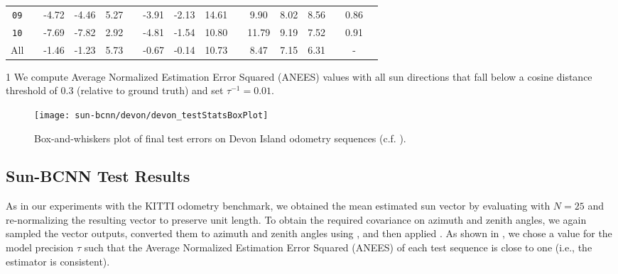 \begin{table}[]
{\begin{threeparttable}
\begin{tabular}{@{}cccccccccccccccc@{}}
\texttt{09} &  & -4.72 & -4.46           & 5.27  &  & -3.91 & -2.13          & 14.61 &  & 9.90  & 8.02            & 8.56 &  & 0.86                 \\
\texttt{10} &  & -7.69 & -7.82           & 2.92  &  & -4.81 & -1.54          & 10.80 &  & 11.79 & 9.19            & 7.52 &  & 0.91                 \\ \midrule
  All  &  & -1.46 & -1.23           & 5.73 &  & -0.67 & -0.14         & 10.73 &  & 8.47  & 7.15            & 6.31 &  &  - \\ \bottomrule                   
\end{tabular}
\begin{tablenotes}
	\item[1] We compute Average Normalized Estimation Error Squared (ANEES) values with all sun directions that fall below a cosine distance threshold of $0.3$ (relative to ground truth) and set $\tau^{-1} = 0.01$.
 \end{tablenotes}
\end{threeparttable}
}
\end{table}

\begin{figure}
    \centering
    \texttt{[image: sun-bcnn/devon/devon\_testStatsBoxPlot]}
    \caption{Box-and-whiskers plot of final test errors on Devon Island odometry sequences (c.f. ).}
    \label{fig:sun-bcnn_devon_test_error_whiskers}
\end{figure}

\subsection{Sun-BCNN Test Results}
As in our experiments with the KITTI odometry benchmark, we obtained the mean estimated sun vector by evaluating  with $N=25$ and re-normalizing the resulting vector to preserve unit length. 
To obtain the required covariance on azimuth and zenith angles, we again sampled the vector outputs, converted them to azimuth and zenith angles using , and then applied .
As shown in , we chose a value for the model precision $\tau$ such that the Average Normalized Estimation Error Squared (ANEES) of each test sequence is close to one (i.e., the estimator is consistent).

